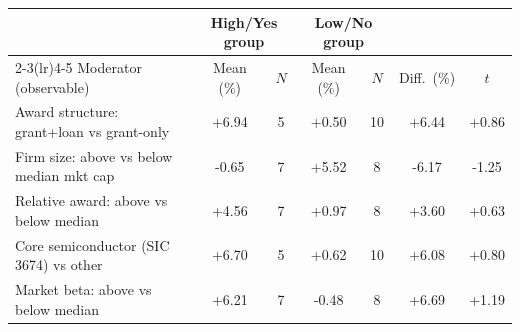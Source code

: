 \begin{tabular}{lcccccc}
\toprule
& \multicolumn{2}{c}{High/Yes group} & \multicolumn{2}{c}{Low/No group} & & \\
\cmidrule(lr){2-3}\cmidrule(lr){4-5}
Moderator (observable) & Mean (\%) & $N$ & Mean (\%) & $N$ & Diff.\ (\%) & $t$ \\
\midrule
Award structure: grant+loan vs grant-only & +6.94 & 5 & +0.50 & 10 & +6.44 & +0.86 \\
Firm size: above vs below median mkt cap & -0.65 & 7 & +5.52 & 8 & -6.17 & -1.25 \\
Relative award: above vs below median & +4.56 & 7 & +0.97 & 8 & +3.60 & +0.63 \\
Core semiconductor (SIC 3674) vs other & +6.70 & 5 & +0.62 & 10 & +6.08 & +0.80 \\
Market beta: above vs below median & +6.21 & 7 & -0.48 & 8 & +6.69 & +1.19 \\
\bottomrule
\end{tabular}
